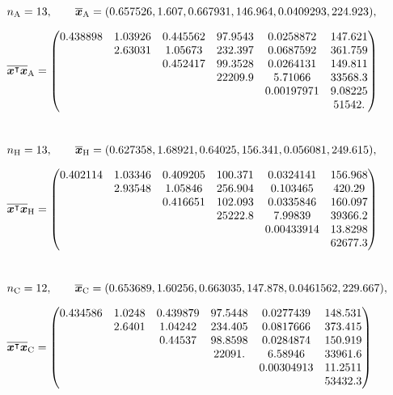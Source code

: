 \documentclass[\ifafour a4paper,12pt,\else a5paper,10pt,\fi%
onecolumn,oneside,article,%
british%
]{memoir}
\theoremstyle{remark}
\theoremstyle{innote}
\renewcommand*{\|}{\mathpunct{|}}
\newcommand*{\T}{^\intercal}%
\newcommand*{\yx}{x}
\newcommand*{\yxx}{\bm{\yx}}
\newcommand*{\ya}{\mathrm{A}}
\newcommand*{\yi}{\mathrm{C}}
\newcommand*{\yh}{\mathrm{H}}
\newcommand*{\yn}{n}
\newcommand*{\yna}{\yn_{\ya}}
\newcommand*{\ynh}{\yn_{\yh}}
\newcommand*{\yni}{\yn_{\yi}}
\newcommand*{\vxxa}{\overline{\yxx}_{\ya}}
\newcommand*{\vxta}{\overline{\yxx\T\yxx}_{\ya}}
\newcommand*{\vxxh}{\overline{\yxx}_{\yh}}
\newcommand*{\vxth}{\overline{\yxx\T\yxx}_{\yh}}
\newcommand*{\vxxi}{\overline{\yxx}_{\yi}}
\newcommand*{\vxti}{\overline{\yxx\T\yxx}_{\yi}}
\theoremstyle{plain}
\begin{document}
\begin{table}[!h]
  \centering\footnotesize
    \begin{equation*}
\begin{aligned}
  &\yna=13, \qquad
  \vxxa=(0.657526,1.607,0.667931,146.964,0.0409293,224.923),
  \\[2\jot]
  &\vxta=
  \begin{pmatrix}
0.438898 & 	1.03926 & 	0.445562 & 	97.9543 & 	0.0258872 & 	147.621 \\
 & 	2.63031 & 	1.05673 & 	232.397 & 	0.0687592 & 	361.759 \\
 & 	 & 	0.452417 & 	99.3528 & 	0.0264131 & 	149.811 \\
 & 	 & 	 & 	22209.9 & 	5.71066 & 	33568.3 \\
 & 	 & 	 & 	 & 	0.00197971 & 	9.08225 \\
 & 	 & 	 & 	 & 	 & 	51542. 
  \end{pmatrix}
  \\[8\jot]
  &\ynh=13, \qquad\vxxh=(0.627358,1.68921,0.64025,156.341,0.056081,249.615),
  \\[2\jot]
  &\vxth=
  \begin{pmatrix}
0.402114 & 	1.03346 & 	0.409205 & 	100.371 & 	0.0324141 & 	156.968 \\
 & 	2.93548 & 	1.05846 & 	256.904 & 	0.103465 & 	420.29 \\
 & 	 & 	0.416651 & 	102.093 & 	0.0335846 & 	160.097 \\
 & 	 & 	 & 	25222.8 & 	7.99839 & 	39366.2 \\
 & 	 & 	 & 	 & 	0.00433914 & 	13.8298 \\
 & 	 & 	 & 	 & 	 & 	62677.3 
  \end{pmatrix}
  \\[8\jot]
  &\yni=12, \qquad  \vxxi=(0.653689, 1.60256, 0.663035, 147.878, 0.0461562,
  229.667), \\[2\jot]
  &\vxti=
  \begin{pmatrix}
0.434586 & 	1.0248 & 	0.439879 & 	97.5448 & 	0.0277439 & 	148.531 \\
 & 	2.6401 & 	1.04242 & 	234.405 & 	0.0817666 & 	373.415 \\
 & 	 & 	0.44537 & 	98.8598 & 	0.0284874 & 	150.919 \\
 & 	 & 	 & 	22091. & 	6.58946 & 	33961.6 \\
 & 	 & 	 & 	 & 	0.00304913 & 	11.2511 \\
 & 	 & 	 & 	 & 	 & 	53432.3 
  \end{pmatrix}
\end{aligned}
\end{equation*}\bigskip
  \caption{Sufficient statistics from Claudia's data of
    table~\ref{tab:simones_data}.}
  \label{tab:simones_data_suff_stat}
\end{table}
\end{document}
